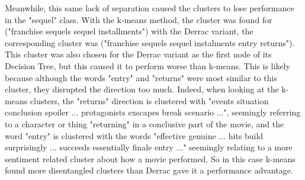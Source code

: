 

Meanwhile, this same lack of separation caused the clusters to lose performance in the "sequel" class. With the k-means method, the cluster was found for ("franchise sequels sequel installments") with the Derrac variant, the corresponding cluster was ("franchise sequels sequel instalments entry returns"). This cluster was also chosen for the Derrac variant as the first node of its Decision Tree, but this caused it to perform worse than k-means. This is likely because although the words "entry" and "returns" were most similar to this cluster, they disrupted the direction too much. Indeed, when looking at the k-means clusters, the "returns" direction is clustered with "events situation conclusion spoiler ... protagonists exscapes break scenario ...", seemingly referring to a character or thing "returning" in a conclusive part of the movie, and the word "entry" is clustered with the words "effective genuine ... hits build surprisingly ... succeeds essentially finale entry ..." seemingly relating to a more sentiment related cluster about how a movie performed. So in this case k-means found more disentangled clusters than Derrac gave it a performance advantage. 






